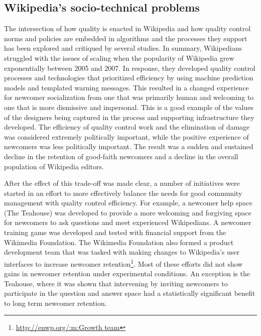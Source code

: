 \subsection{Wikipedia's socio-technical problems}
The intersection of how quality is enacted in Wikipedia and how quality control norms and policies are embedded in algorithms and the processes they support has been explored and critiqued by several studies\cite{halfaker2013rise}\cite{morgan2013tea}\cite{halfaker2014snuggle}.  In summary, Wikipedians struggled with the issues of scaling when the popularity of Wikipedia grew exponentially between 2005 and 2007\cite{halfaker2013rise}.  In response, they developed quality control processes and technologies that prioritized efficiency by using machine prediction models\cite{halfaker2014snuggle} and templated warning messages\cite{halfaker2013rise}.  This resulted in a changed experience for newcomer socialization from one that was primarily human and welcoming to one that is more dismissive and impersonal\cite{morgan2013tea}.  This is a good example of the values of the designers being captured in the process and supporting infrastructure they developed\cite{halfaker2014snuggle}.  The efficiency of quality control work and the elimination of damage was considered extremely politically important, while the positive experience of newcomers was less politically important.  The result was a sudden and sustained decline in the retention of good-faith newcomers and a decline in the overall population of Wikipedia editors\cite{halfaker2013rise}.

After the effect of this trade-off was made clear, a number of initiatives were started in an effort to more effectively balance the needs for good community management with quality control efficiency.  For example, a newcomer help space (The Teahouse\cite{morgan2013tea}) was developed to provide a more welcoming and forgiving space for newcomers to ask questions and meet experienced Wikipedians.  A newcomer training game was developed and tested with financial support from the Wikimedia Foundation\cite{narayan2015effects}.  The Wikimedia Foundation also formed a product development team that was tasked with making changes to Wikipedia's user interfaces to increase newcomer retention\footnote{\url{http://enwp.org/:m:Growth team}}.  Most of these efforts did not show gains in newcomer retention under experimental conditions.  An exception is the Teahouse, where it was shown that intervening by inviting newcomers to participate in the question and answer space had a statistically significant benefit to long term newcomer retention\cite{morgan2018evaluating}.

